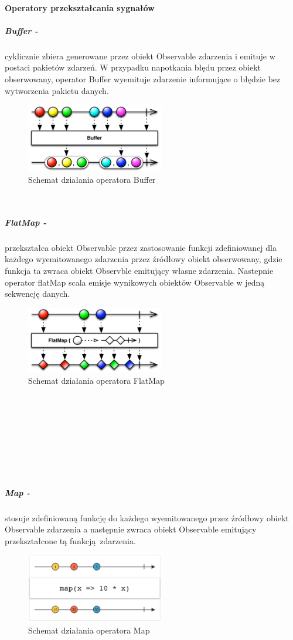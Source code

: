 \documentclass[12pt,oneside,a4paper]{report}
\begin{document}
\paragraph{Operatory przekształcania sygnałów}
\subparagraph{Buffer -}cyklicznie zbiera generowane przez obiekt Observable zdarzenia i emituje w postaci pakietów zdarzeń. W przypadku napotkania błędu przez obiekt obserwowany, operator Buffer wyemituje zdarzenie informujące o błędzie bez wytworzenia pakietu danych.
\begin{figure}[ht!]
	\centering
	\includegraphics[width=6cm]{buffer}
	\caption{Schemat działania operatora Buffer}
	\label{buffer}
\end{figure}\\
\subparagraph{FlatMap -}przekształca obiekt Observable przez zastosowanie funkcji zdefiniowanej dla każdego wyemitowanego zdarzenia przez źródłowy obiekt obserwowany, gdzie funkcja ta zwraca obiekt Observble emitujący własne zdarzenia. Nastepnie operator flatMap scala emisje wynikowych obiektów Observable w jedną sekwencję danych.
\begin{figure}[ht!]
	\centering
	\includegraphics[width=6cm]{flatmap}
	\caption{Schemat działania operatora FlatMap}
	\label{flatmap}
\end{figure}\\\\\\\\\\\\\\
\subparagraph{Map -}stosuje zdefiniowaną funkcję do każdego wyemitowanego przez źródłowy obiekt Observable zdarzenia a następnie zwraca obiekt Observable emitujący przekształcone tą funkcją zdarzenia.
\begin{figure}[ht!]
	\centering
	\includegraphics[width=6cm]{map}
	\caption{Schemat działania operatora Map}
	\label{map}
\end{figure}\\
\end{document}
